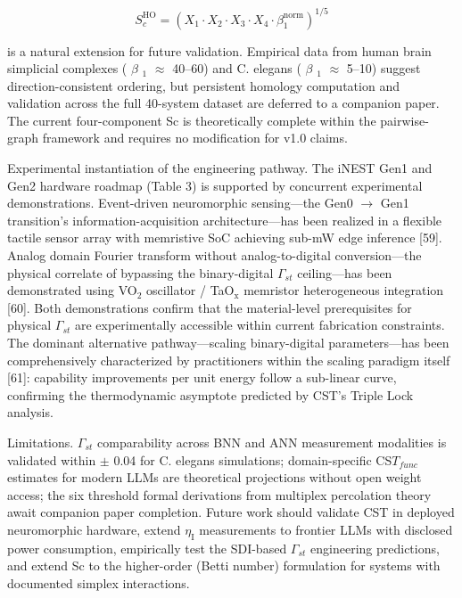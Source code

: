 \documentclass[a4paper,12pt]{article}
\providecommand{\textsubscript}[1]{\ensuremath{_{\text{#1}}}}
\begin{document}
\begin{equation}
S_c^{\text{HO}} = (X_1 \cdot X_2 \cdot X_3 \cdot X_4 \cdot \beta_1^{\text{norm}})^{1/5}
\end{equation}

is a natural extension for future validation. Empirical data from human brain simplicial complexes ( $\beta$ \textsubscript{1}  $\approx$  40--60) and C. elegans ( $\beta$ \textsubscript{1}  $\approx$  5--10) suggest direction-consistent ordering, but persistent homology computation and validation across the full 40-system dataset are deferred to a companion paper. The current four-component Sc is theoretically complete within the pairwise-graph framework and requires no modification for v1.0 claims.

Experimental instantiation of the engineering pathway.
The iNEST Gen1 and Gen2 hardware roadmap (Table 3) is supported by concurrent experimental demonstrations.
Event-driven neuromorphic sensing---the Gen0 $\rightarrow$ Gen1 transition's information-acquisition architecture---has been realized in a flexible tactile sensor array with memristive SoC achieving sub-mW edge inference [59].
Analog domain Fourier transform without analog-to-digital conversion---the physical correlate of bypassing the binary-digital $\Gamma_{st}$ ceiling---has been demonstrated using VO\textsubscript{2} oscillator / TaO\textsubscript{x} memristor heterogeneous integration [60].
Both demonstrations confirm that the material-level prerequisites for physical $\Gamma_{st}$ are experimentally accessible within current fabrication constraints.
The dominant alternative pathway---scaling binary-digital parameters---has been comprehensively characterized by practitioners within the scaling paradigm itself [61]: capability improvements per unit energy follow a sub-linear curve, confirming the thermodynamic asymptote predicted by CST's Triple Lock analysis.

Limitations. $\Gamma_{st}$ comparability across BNN and ANN measurement modalities is validated within  $\pm$ 0.04 for C. elegans simulations; domain-specific CS$T_{func}$ estimates for modern LLMs are theoretical projections without open weight access; the six threshold formal derivations from multiplex percolation theory await companion paper completion.
Future work should validate CST in deployed neuromorphic hardware, extend $\eta_{\text{I}}$ measurements to frontier LLMs with disclosed power consumption, empirically test the SDI-based $\Gamma_{st}$ engineering predictions, and extend Sc to the higher-order (Betti number) formulation for systems with documented simplex interactions.
\end{document}
